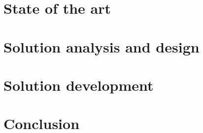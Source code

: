 \documentclass[openany,11pt,twoside,a4paper]{report}
\begin{document}
\chapter{State of the art}
\label{state-of-the-art}

\newpage\cleardoublepage

\chapter{Solution analysis and design} \label{cap:solution-analysis-and-design}

\newpage\cleardoublepage

\chapter{Solution development}
\label{cap:solution-development}

\newpage\cleardoublepage

\chapter{Conclusion}

\newpage\cleardoublepage


\renewcommand\bibname{Bibliography}

   
\end{document}
